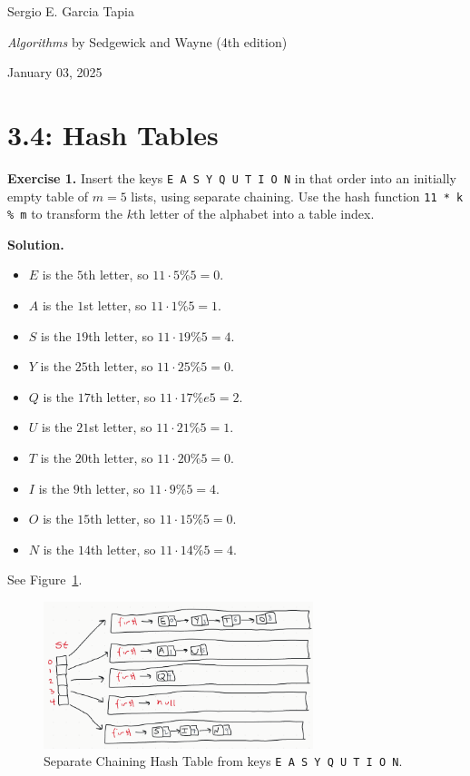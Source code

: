 \documentclass[12pt, a4paper]{article}
\newenvironment{ex}[2][Exercise]
{\par\medskip\noindent \textbf{#1 #2.}}
{\medskip}
\newenvironment{sol}[1][Solution]
{\par\medskip\noindent \textbf{#1.} }
{\medskip}
\begin{document}
	\noindent Sergio E. Garcia Tapia \hfill
	
	\noindent \emph{Algorithms} by Sedgewick and Wayne (4th edition) \cite{sedgewick_wayne}\hfill
	
	\noindent January 03, 2025\hfill 
	\section*{3.4: Hash Tables}
	\begin{ex}{1}
		Insert the keys \texttt{E A S Y Q U T I O N} in that order into an initially empty
		table of $m=5$ lists, using separate chaining. Use the hash function \texttt{11 * k \% m}
		to transform the $k$th letter of the alphabet into a table index.
	\end{ex}
	\begin{sol}
		\begin{itemize}
			\item $E$ is the $5$th letter, so $11\cdot 5 \% 5 = 0$.
			\item $A$ is the $1$st letter, so $11\cdot 1 \% 5 = 1$.
			\item $S$ is the $19$th letter, so $11\cdot 19 \% 5 = 4$.
			\item $Y$ is the $25$th letter, so $11\cdot 25 \% 5 = 0$.
			\item $Q$ is the $17$th letter, so $11\cdot 17 \% e5 = 2$.
			\item $U$ is the $21$st letter, so $11\cdot 21 \% 5 = 1$.
			\item $T$ is the $20$th letter, so $11\cdot 20 \% 5 = 0$.
			\item $I$ is the $9$th letter, so $11\cdot 9 \% 5 = 4$.
			\item $O$ is the $15$th letter, so $11\cdot 15 \% 5 = 0$.
			\item $N$ is the $14$th letter, so $11\cdot 14 \% 5 = 4$.
		\end{itemize}
		See Figure~\ref{fig:ex-01}.
		\begin{figure}
			\centering
			\includegraphics[width=0.7\textwidth]{exercise-01}
			\caption{Separate Chaining Hash Table from keys \texttt{E A S Y Q U T I O N}.}
			\label{fig:ex-01}
		\end{figure}
	\end{sol}
\end{document}
